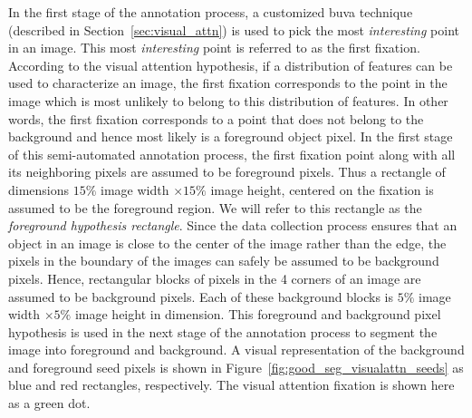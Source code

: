 \documentclass {udthesis}
\begin{document}
In the first stage of the annotation process, a customized \gls{buva} technique (described in Section~\ref{sec:visual_attn}) is used to pick the most \textit{interesting} point in an image. This most \textit{interesting} point is referred to as the first fixation. According to the visual attention hypothesis, if a distribution of features can be used to characterize an image, the first fixation corresponds to the point in the image which is most unlikely to belong to this distribution of features. In other words, the first fixation corresponds to a point that does not belong to the background and hence most likely is a foreground object pixel. In the first stage of this semi-automated annotation process, the first fixation point along with all its neighboring pixels are assumed to be foreground pixels. Thus a rectangle of dimensions $15\%$ image width $\times 15\%$ image height, centered on the fixation is assumed to be the foreground region. We will refer to this rectangle as the \textit{foreground hypothesis rectangle}.
Since the data collection  process ensures that an object in an image is close to the center of the image rather than the edge, the pixels in the boundary of the images can safely be assumed to be background pixels. Hence, rectangular blocks of pixels in the 4 corners of an image are assumed to be background pixels. Each of these background blocks is $5\%$ image width $\times 5\%$ image height in dimension. This foreground and background pixel hypothesis is used in the next stage of the annotation process to segment the image into foreground and background. A visual representation of the background and foreground seed pixels is shown in Figure~\ref{fig:good_seg_visualattn_seeds} as blue and red rectangles, respectively. The visual attention fixation is shown here as a green dot.
\end{document}
